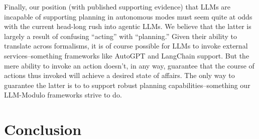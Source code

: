 \documentclass{article}
\newcommand{\bnote}[1]{\color{black}#1\color{black}}
\newcommand{\rao}[1]{\noindent\textcolor{red}{#1}}
\theoremstyle{plain}
\theoremstyle{definition}
\theoremstyle{remark}
\begin{document}








\bnote{Finally, our position (with published supporting evidence) that LLMs are incapable
of supporting planning in autonomous modes must seem quite at odds with
the current head-long rush into agentic LLMs. We believe that the latter is
largely a result of confusing ``acting'' with ``planning.''
Given their ability to translate across formalisms, it 
is of course possible for LLMs to invoke external services--something
frameworks like AutoGPT and LangChain support. But the mere ability to
invoke an action doesn't, in any way, guarantee that the course of
actions thus invoked will achieve a desired state of affairs. The only
way to guarantee the latter is to to support robust planning capabilities--something
our LLM-Modulo frameworks strive to do.}



\section{Conclusion}
\end{document}
